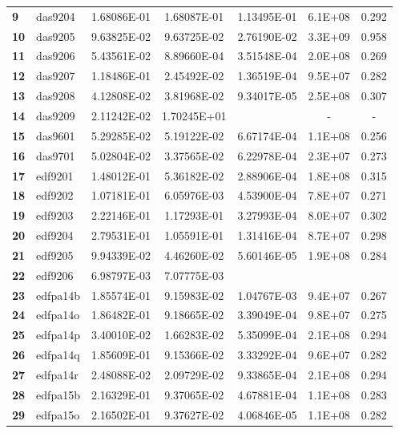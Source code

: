 \begin{longtable}{@{}llS[table-format=1.2e-2]S[table-format=1.2e-2]S[table-format=1.2e-2]ll@{}}
\textbf{9}  & das9204  & 1.68086E-01 & 1.68087E-01 & 1.13495E-01 & 6.1E+08 & 0.292 \\
\textbf{10} & das9205  & 9.63825E-02 & 9.63725E-02 & 2.76190E-02 & 3.3E+09 & 0.958 \\
\textbf{11} & das9206  & 5.43561E-02 & 8.89660E-04 & 3.51548E-04 & 2.0E+08 & 0.269 \\
\textbf{12} & das9207  & 1.18486E-01 & 2.45492E-02 & 1.36519E-04 & 9.5E+07 & 0.282 \\
\textbf{13} & das9208  & 4.12808E-02 & 3.81968E-02 & 9.34017E-05 & 2.5E+08 & 0.307 \\
\textbf{14} &
  das9209 &
  2.11242E-02 &
  1.70245E+01 &
   &
   &
   \\
\textbf{15} & das9601  & 5.29285E-02 & 5.19122E-02 & 6.67174E-04 & 1.1E+08 & 0.256 \\
\textbf{16} & das9701  & 5.02804E-02 & 3.37565E-02 & 6.22978E-04 & 2.3E+07 & 0.273 \\
\textbf{17} & edf9201  & 1.48012E-01 & 5.36182E-02 & 2.88906E-04 & 1.8E+08 & 0.315 \\
\textbf{18} & edf9202  & 1.07181E-01 & 6.05976E-03 & 4.53900E-04 & 7.8E+07 & 0.271 \\
\textbf{19} & edf9203  & 2.22146E-01 & 1.17293E-01 & 3.27993E-04 & 8.0E+07 & 0.302 \\
\textbf{20} & edf9204  & 2.79531E-01 & 1.05591E-01 & 1.31416E-04 & 8.7E+07 & 0.298 \\
\textbf{21} & edf9205  & 9.94339E-02 & 4.46260E-02 & 5.60146E-05 & 1.9E+08 & 0.284 \\
\textbf{22} & edf9206  & 6.98797E-03 & 7.07775E-03 &                                    &        &      \\
\textbf{23} & edfpa14b & 1.85574E-01 & 9.15983E-02 & 1.04767E-03 & 9.4E+07 & 0.267 \\
\textbf{24} & edfpa14o & 1.86482E-01 & 9.18665E-02 & 3.39049E-04 & 9.8E+07 & 0.275 \\
\textbf{25} & edfpa14p & 3.40010E-02 & 1.66283E-02 & 5.35099E-04 & 2.1E+08 & 0.294 \\
\textbf{26} & edfpa14q & 1.85609E-01 & 9.15366E-02 & 3.33292E-04 & 9.6E+07 & 0.282 \\
\textbf{27} & edfpa14r & 2.48088E-02 & 2.09729E-02 & 9.33865E-04 & 2.1E+08 & 0.294 \\
\textbf{28} & edfpa15b & 2.16329E-01 & 9.37065E-02 & 4.67881E-04 & 1.1E+08 & 0.283 \\
\textbf{29} & edfpa15o & 2.16502E-01 & 9.37627E-02 & 4.06846E-05 & 1.1E+08 & 0.282 \\

\end{longtable}
